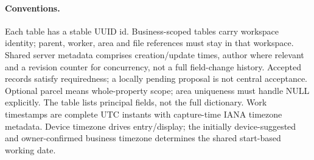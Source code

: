 \paragraph{Conventions.}
Each table has a stable UUID id. Business-scoped tables carry workspace identity;
parent, worker, area and file references must stay in that workspace. Shared server
metadata comprises creation/update times, author where relevant and a revision
counter for concurrency, not a full field-change history. Accepted records satisfy
requiredness; a locally pending proposal is not central acceptance.
Optional parcel means whole-property scope; area uniqueness must handle NULL
explicitly. The table lists principal fields, not the full dictionary. Work timestamps are complete UTC instants with capture-time IANA timezone metadata. Device timezone drives entry/display; the initially device-suggested and owner-confirmed business timezone determines the shared start-based working date.
